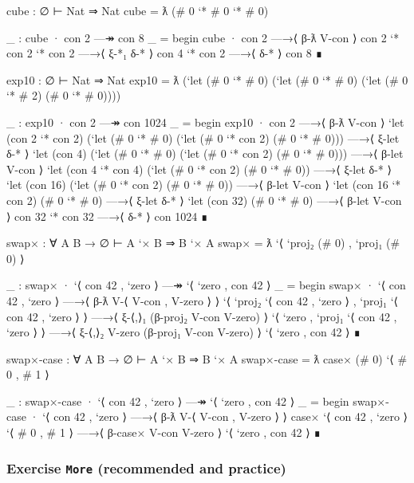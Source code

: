 \begin{fence}
\begin{code}
cube : ∅ ⊢ Nat ⇒ Nat
cube = ƛ (# 0 `* # 0 `* # 0)

_ : cube · con 2 —↠ con 8
_ =
  begin
    cube · con 2
  —→⟨ β-ƛ V-con ⟩
    con 2 `* con 2 `* con 2
  —→⟨ ξ-*₁ δ-* ⟩
    con 4 `* con 2
  —→⟨ δ-* ⟩
    con 8
  ∎

exp10 : ∅ ⊢ Nat ⇒ Nat
exp10 = ƛ (`let (# 0 `* # 0)
            (`let (# 0 `* # 0)
              (`let (# 0 `* # 2)
                (# 0 `* # 0))))

_ : exp10 · con 2 —↠ con 1024
_ =
  begin
    exp10 · con 2
  —→⟨ β-ƛ V-con ⟩
    `let (con 2 `* con 2) (`let (# 0 `* # 0) (`let (# 0 `* con 2) (# 0 `* # 0)))
  —→⟨ ξ-let δ-* ⟩
    `let (con 4) (`let (# 0 `* # 0) (`let (# 0 `* con 2) (# 0 `* # 0)))
  —→⟨ β-let V-con ⟩
    `let (con 4 `* con 4) (`let (# 0 `* con 2) (# 0 `* # 0))
  —→⟨ ξ-let δ-* ⟩
    `let (con 16) (`let (# 0 `* con 2) (# 0 `* # 0))
  —→⟨ β-let V-con ⟩
    `let (con 16 `* con 2) (# 0 `* # 0)
  —→⟨ ξ-let δ-* ⟩
    `let (con 32) (# 0 `* # 0)
  —→⟨ β-let V-con ⟩
    con 32 `* con 32
  —→⟨ δ-* ⟩
    con 1024
  ∎

swap× : ∀ {A B} → ∅ ⊢ A `× B ⇒ B `× A
swap× = ƛ `⟨ `proj₂ (# 0) , `proj₁ (# 0) ⟩

_ : swap× · `⟨ con 42 , `zero ⟩ —↠ `⟨ `zero , con 42 ⟩
_ =
  begin
    swap× · `⟨ con 42 , `zero ⟩
  —→⟨ β-ƛ V-⟨ V-con , V-zero ⟩ ⟩
    `⟨ `proj₂ `⟨ con 42 , `zero ⟩ , `proj₁ `⟨ con 42 , `zero ⟩ ⟩
  —→⟨ ξ-⟨,⟩₁ (β-proj₂ V-con V-zero) ⟩
    `⟨ `zero , `proj₁ `⟨ con 42 , `zero ⟩ ⟩
  —→⟨ ξ-⟨,⟩₂ V-zero (β-proj₁ V-con V-zero) ⟩
    `⟨ `zero , con 42 ⟩
  ∎

swap×-case : ∀ {A B} → ∅ ⊢ A `× B ⇒ B `× A
swap×-case = ƛ case× (# 0) `⟨ # 0 , # 1 ⟩

_ : swap×-case · `⟨ con 42 , `zero ⟩ —↠ `⟨ `zero , con 42 ⟩
_ =
  begin
     swap×-case · `⟨ con 42 , `zero ⟩
   —→⟨ β-ƛ V-⟨ V-con , V-zero ⟩ ⟩
     case× `⟨ con 42 , `zero ⟩ `⟨ # 0 , # 1 ⟩
   —→⟨ β-case× V-con V-zero ⟩
     `⟨ `zero , con 42 ⟩
   ∎
\end{code}
\end{fence}

\hypertarget{exercise-more-recommended-and-practice}{%
\subsubsection{\texorpdfstring{Exercise \texttt{More} (recommended and
practice)}{Exercise More (recommended and practice)}}\label{exercise-more-recommended-and-practice}}

